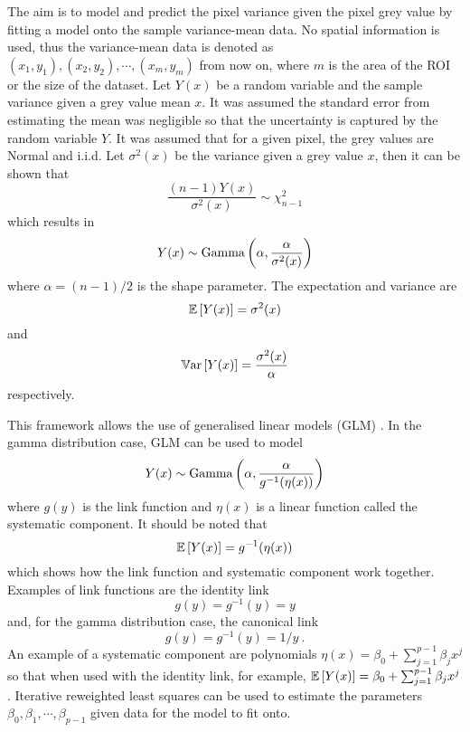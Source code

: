 The aim is to model and predict the pixel variance given the pixel grey value by fitting a model onto the sample variance-mean data. No spatial information is used, thus the variance-mean data is denoted as $(x_1,y_1),(x_2,y_2),\cdots,(x_m,y_m)$ from now on, where $m$ is the area of the ROI or the size of the dataset. Let $Y(x)$ be a random variable and the sample variance given a grey value mean $x$. It was assumed the standard error from estimating the mean was negligible so that the uncertainty is captured by the random variable $Y$. It was assumed that for a given pixel, the grey values are Normal and i.i.d. Let $\sigma^2(x)$ be the variance given a grey value $x$, then it can be shown that
\begin{equation}
\dfrac{(n-1)Y(x)}{\sigma^2(x)}\sim\chi^2_{n-1}
\end{equation}
which results in
\begin{equation}
Y(x)\sim\operatorname{Gamma}\left(\alpha,\dfrac{\alpha}{\sigma^2(x)}\right)
\end{equation}
where $\alpha=(n-1)/2$ is the shape parameter. The expectation and variance are
\begin{equation}
\operatorname{\mathbb{E}}\left[Y(x)\right]=\sigma^2(x)
\end{equation}
and
\begin{equation}
\operatorname{\mathbb{V}ar}\left[Y(x)\right]=\dfrac{\sigma^2(x)}{\alpha}
\end{equation}
respectively.

This framework allows the use of generalised linear models (GLM) \citep{nelder1972generalized,nelder1972generalized_2, mccullagh1984generalized}. In the gamma distribution case, GLM can be used to model
\begin{equation}
Y(x)\sim\operatorname{Gamma}\left(\alpha,\dfrac{\alpha}{g^{-1}(\eta(x))}\right)
\end{equation}
where $g(y)$ is the link function and $\eta(x)$ is a linear function called the systematic component. It should be noted that
\begin{equation}
  \operatorname{\mathbb{E}}\left[Y(x)\right]=g^{-1}(\eta(x))
\end{equation}
which shows how the link function and systematic component work together. Examples of link functions are the identity link
\begin{equation}
g(y)=g^{-1}(y)=y
\end{equation}
and, for the gamma distribution case, the canonical link
\begin{equation}
g(y)=g^{-1}(y)=1/y \ .
\end{equation}
An example of a systematic component are polynomials $\eta(x)=\beta_0+\sum_{j=1}^{p-1}\beta_j x^j$ so that when used with the identity link, for example, $\operatorname{\mathbb{E}}\left[Y(x)\right] = \beta_0+\sum_{j=1}^{p-1}\beta_j x^j$. Iterative reweighted least squares \citep{friedman2001elements} can be used to estimate the parameters $\beta_0, \beta_1, \cdots, \beta_{p-1}$ given data for the model to fit onto.

